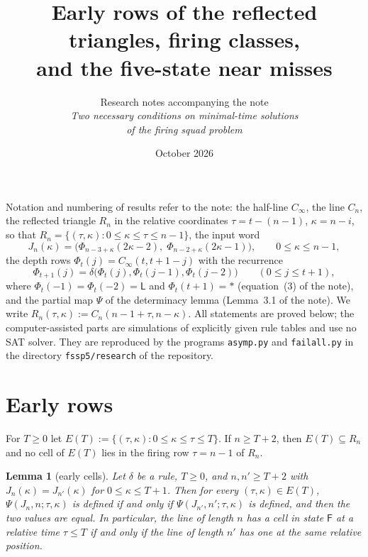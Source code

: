 \documentclass[11pt]{article}
\title{Early rows of the reflected triangles, firing classes,\\
and the five-state near misses}
\author{Research notes accompanying the note\\
\emph{Two necessary conditions on minimal-time solutions}\\
\emph{of the firing squad problem}}
\date{October 2026}
\newtheorem{lemma}[theorem]{Lemma}
\theoremstyle{definition}
\theoremstyle{remark}
\newcommand{\Lq}{\mathsf L}
\newcommand{\Fq}{\mathsf F}
\begin{document}
\maketitle

\noindent Notation and numbering of results refer to the note: the half-line
$C_\infty$, the line $C_n$, the reflected triangle $R_n$ in the relative
coordinates $\tau=t-(n-1)$, $\kappa=n-i$, so that
$R_n=\{(\tau,\kappa):0\le\kappa\le\tau\le n-1\}$, the input word
\[
J_n(\kappa)=\bigl(\Phi_{n-3+\kappa}(2\kappa-2),\;\Phi_{n-2+\kappa}(2\kappa-1)\bigr),
\qquad 0\le\kappa\le n-1,
\]
the depth rows $\Phi_t(j)=C_\infty(t,t+1-j)$ with the recurrence
\begin{equation}\label{eq:comoving}
\Phi_{t+1}(j)=\delta\bigl(\Phi_t(j),\Phi_t(j-1),\Phi_t(j-2)\bigr)\qquad
(0\le j\le t+1),
\end{equation}
where $\Phi_t(-1)=\Phi_t(-2)=\Lq$ and $\Phi_t(t+1)=\ast$ (equation~(3) of the
note), and the partial map $\Psi$ of the determinacy lemma (Lemma~3.1 of the
note). We write $R_n(\tau,\kappa):=C_n(n-1+\tau,n-\kappa)$. All statements are
proved below; the computer-assisted parts are simulations of explicitly given
rule tables and use no SAT solver. They are reproduced by the programs
\texttt{asymp.py} and \texttt{failall.py} in the directory
\texttt{fssp5/research} of the repository.

\section{Early rows}\label{sec:early}

For $T\ge0$ let $E(T):=\{(\tau,\kappa):0\le\kappa\le\tau\le T\}$. If $n\ge T+2$,
then $E(T)\subseteq R_n$ and no cell of $E(T)$ lies in the firing row
$\tau=n-1$ of $R_n$.

\begin{lemma}[early cells]\label{lem:early}
Let $\delta$ be a rule, $T\ge0$, and $n,n'\ge T+2$ with $J_n(\kappa)=J_{n'}(\kappa)$
for $0\le\kappa\le T+1$. Then for every $(\tau,\kappa)\in E(T)$,
$\Psi(J_n,n;\tau,\kappa)$ is defined if and only if
$\Psi(J_{n'},n';\tau,\kappa)$ is defined, and then the two values are equal. In
particular, the line of length $n$ has a cell in state $\Fq$ at a relative time
$\tau\le T$ if and only if the line of length $n'$ has one at the same relative
position.
\end{lemma}
\end{document}
